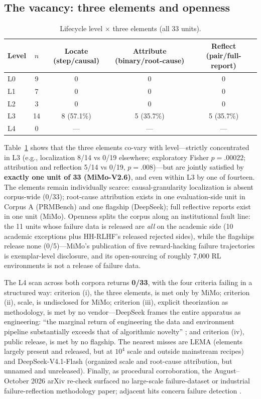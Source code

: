 \documentclass[10pt]{article}
\begin{document}
\subsection{The vacancy: three elements and openness}

\begin{table}[t]
\centering
\caption{Lifecycle level $\times$ three elements (all 33 units).}
\label{tab:elements}
\small
\begin{tabular}{lcccc}
\toprule
Level & $n$ & Locate (step/causal) & Attribute (binary/root-cause) & Reflect (pair/full-report) \\
\midrule
L0 & 9 & 0 & 0 & 0 \\
L1 & 7 & 0 & 0 & 0 \\
L2 & 3 & 0 & 0 & 0 \\
L3 & 14 & 8 (57.1\%) & 5 (35.7\%) & 5 (35.7\%) \\
L4 & 0 & --- & --- & --- \\
\bottomrule
\end{tabular}
\end{table}

Table~\ref{tab:elements} shows that the three elements co-vary with level---strictly concentrated in L3 (e.g., localization 8/14 vs 0/19 elsewhere; exploratory Fisher $p = .00022$; attribution and reflection 5/14 vs 0/19, $p = .008$)---but are jointly satisfied by \textbf{exactly one unit of 33 (MiMo-V2.6)}, and even within L3 by one of fourteen. The elements remain individually scarce: causal-granularity localization is absent corpus-wide (0/33); root-cause attribution exists in one evaluation-side unit in Corpus A (PRMBench) and one flagship (DeepSeek); full reflective reports exist in one unit (MiMo). Openness splits the corpus along an institutional fault line: the 11 units whose failure data is released are \emph{all} on the academic side (10 academic exceptions plus HH-RLHF's released rejected sides), while the flagships release none (0/5)---MiMo's publication of five reward-hacking failure trajectories is exemplar-level disclosure, and its open-sourcing of roughly 7,000 RL environments is not a release of failure data.

The L4 scan across both corpora returns \textbf{0/33}, with the four criteria failing in a structured way: criterion (i), the three elements, is met only by MiMo; criterion (ii), scale, is undisclosed for MiMo; criterion (iii), explicit theorization as methodology, is met by no vendor---DeepSeek frames the entire apparatus as engineering: ``the marginal return of engineering the data and environment pipeline substantially exceeds that of algorithmic novelty'' \cite{deepseek2026v41}; and criterion (iv), public release, is met by no flagship. The nearest misses are LEMA (elements largely present and released, but at $10^4$ scale and outside mainstream recipes) and DeepSeek-V4.1-Flash (organized scale and root-cause attribution, but unnamed and unreleased). Finally, as procedural corroboration, the August--October 2026 arXiv re-check surfaced no large-scale failure-dataset or industrial failure-reflection methodology paper; adjacent hits concern failure detection \cite{zhang2026foresight}.
\end{document}
